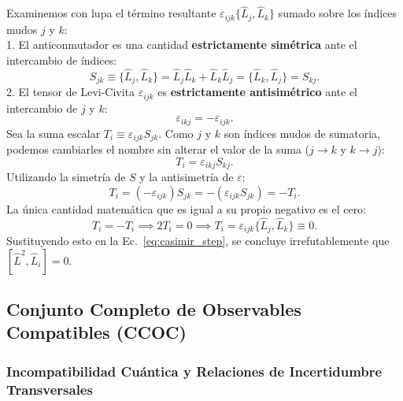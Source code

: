 \begin{alertabox}
    Examinemos con lupa el término resultante $\varepsilon_{ijk}\{\hat{L}_j, \hat{L}_k\}$ sumado sobre los índices mudos $j$ y $k$:\\
    1. El anticonmutador es una cantidad \textbf{estrictamente simétrica} ante el intercambio de índices:
    \begin{equation}
        S_{jk} \equiv \{\hat{L}_j, \hat{L}_k\} = \hat{L}_j\hat{L}_k + \hat{L}_k\hat{L}_j = \{\hat{L}_k, \hat{L}_j\} = S_{kj}.
    \end{equation}
    2. El tensor de Levi-Civita $\varepsilon_{ijk}$ es \textbf{estrictamente antisimétrico} ante el intercambio de $j$ y $k$:
    \begin{equation}
        \varepsilon_{ikj} = -\varepsilon_{ijk}.
    \end{equation}
    Sea la suma escalar $T_i \equiv \varepsilon_{ijk} S_{jk}$. Como $j$ y $k$ son índices mudos de sumatoria, podemos cambiarles el nombre sin alterar el valor de la suma ($j \to k$ y $k \to j$):
    \begin{equation}
        T_i = \varepsilon_{ikj} S_{kj}.
    \end{equation}
    Utilizando la simetría de $S$ y la antisimetría de $\varepsilon$:
    \begin{equation}
        T_i = (-\varepsilon_{ijk}) S_{jk} = -(\varepsilon_{ijk} S_{jk}) = -T_i.
    \end{equation}
    La única cantidad matemática que es igual a su propio negativo es el cero:
    \begin{equation}
        T_i = -T_i \implies 2T_i = 0 \implies \boxed{T_i = \varepsilon_{ijk}\{\hat{L}_j, \hat{L}_k\} \equiv 0}.
    \end{equation}
    Sustituyendo esto en la Ec.~\eqref{eq:casimir_step}, se concluye irrefutablemente que $[\hat{L}^2, \hat{L}_i] = 0$.
\end{alertabox}

\subsection{Conjunto Completo de Observables Compatibles (CCOC)}

\subsubsection{Incompatibilidad Cuántica y Relaciones de Incertidumbre Transversales}

